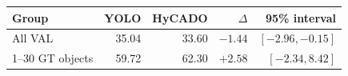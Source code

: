 \begin{tabular}{lrrrr}
\toprule
Group & YOLO & HyCADO & $\Delta$ & 95\% interval\\
\midrule
All VAL & 35.04 & 33.60 & $-1.44$ & $[-2.96, -0.15]$\\
1--30 GT objects & 59.72 & 62.30 & $+2.58$ & $[-2.34, 8.42]$\\
\bottomrule
\end{tabular}

